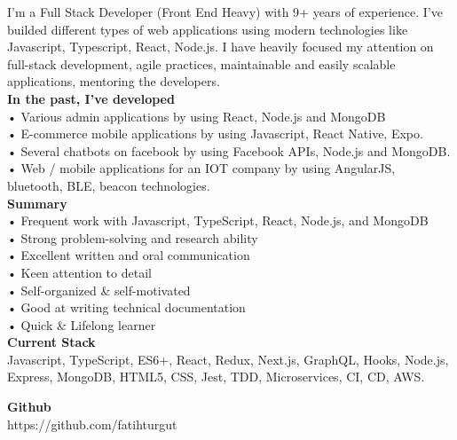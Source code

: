 

\begin{cvparagraph}

I'm a Full Stack Developer (Front End Heavy) with 9+ years of experience. I've builded different types of web applications using modern technologies like Javascript, Typescript, React, Node.js. I have heavily focused my attention on full-stack development, agile practices, maintainable and easily scalable applications, mentoring the developers. \\

\textbf {In the past, I've developed} \\
• Various admin applications by using React, Node.js and MongoDB \\
• E-commerce mobile applications by using Javascript, React Native, Expo. \\
• Several chatbots on facebook by using Facebook APIs, Node.js and MongoDB. \\
• Web / mobile applications for an IOT company by using AngularJS, bluetooth, BLE, beacon technologies. \\

\textbf {Summary} \\
• Frequent work with Javascript, TypeScript, React, Node.js, and MongoDB \\
• Strong problem-solving and research ability \\
• Excellent written and oral communication \\
• Keen attention to detail \\
• Self-organized {\&} self-motivated \\
• Good at writing technical documentation \\
• Quick {\&} Lifelong learner \\


\textbf {Current Stack} \\
Javascript, TypeScript, ES6+, React, Redux, Next.js, GraphQL, Hooks, Node.js, Express, MongoDB, HTML5, CSS, Jest, TDD, Microservices, CI, CD, AWS.

\textbf {Github} \\
https://github.com/fatihturgut

\end{cvparagraph}
